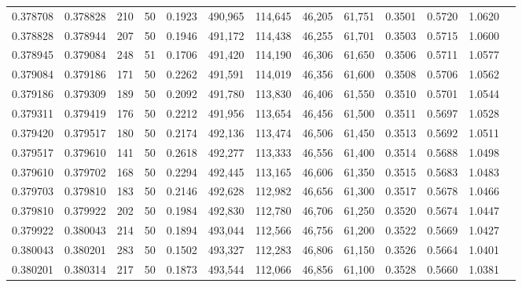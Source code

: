 \begin{tabular}{rrrrrrrrrrrrr}
0.378708 & 0.378828 &   210 &  50 &                                     0.1923 & 490,965 & 114,645 &  46,205 &  61,751 & 0.3501 & 0.5720 & 1.0620 \\
0.378828 & 0.378944 &   207 &  50 &                                     0.1946 & 491,172 & 114,438 &  46,255 &  61,701 & 0.3503 & 0.5715 & 1.0600 \\
0.378945 & 0.379084 &   248 &  51 &                                     0.1706 & 491,420 & 114,190 &  46,306 &  61,650 & 0.3506 & 0.5711 & 1.0577 \\
0.379084 & 0.379186 &   171 &  50 &                                     0.2262 & 491,591 & 114,019 &  46,356 &  61,600 & 0.3508 & 0.5706 & 1.0562 \\
0.379186 & 0.379309 &   189 &  50 &                                     0.2092 & 491,780 & 113,830 &  46,406 &  61,550 & 0.3510 & 0.5701 & 1.0544 \\
0.379311 & 0.379419 &   176 &  50 &                                     0.2212 & 491,956 & 113,654 &  46,456 &  61,500 & 0.3511 & 0.5697 & 1.0528 \\
0.379420 & 0.379517 &   180 &  50 &                                     0.2174 & 492,136 & 113,474 &  46,506 &  61,450 & 0.3513 & 0.5692 & 1.0511 \\
0.379517 & 0.379610 &   141 &  50 &                                     0.2618 & 492,277 & 113,333 &  46,556 &  61,400 & 0.3514 & 0.5688 & 1.0498 \\
0.379610 & 0.379702 &   168 &  50 &                                     0.2294 & 492,445 & 113,165 &  46,606 &  61,350 & 0.3515 & 0.5683 & 1.0483 \\
0.379703 & 0.379810 &   183 &  50 &                                     0.2146 & 492,628 & 112,982 &  46,656 &  61,300 & 0.3517 & 0.5678 & 1.0466 \\
0.379810 & 0.379922 &   202 &  50 &                                     0.1984 & 492,830 & 112,780 &  46,706 &  61,250 & 0.3520 & 0.5674 & 1.0447 \\
0.379922 & 0.380043 &   214 &  50 &                                     0.1894 & 493,044 & 112,566 &  46,756 &  61,200 & 0.3522 & 0.5669 & 1.0427 \\
0.380043 & 0.380201 &   283 &  50 &                                     0.1502 & 493,327 & 112,283 &  46,806 &  61,150 & 0.3526 & 0.5664 & 1.0401 \\
0.380201 & 0.380314 &   217 &  50 &                                     0.1873 & 493,544 & 112,066 &  46,856 &  61,100 & 0.3528 & 0.5660 & 1.0381 \\

\end{tabular}
